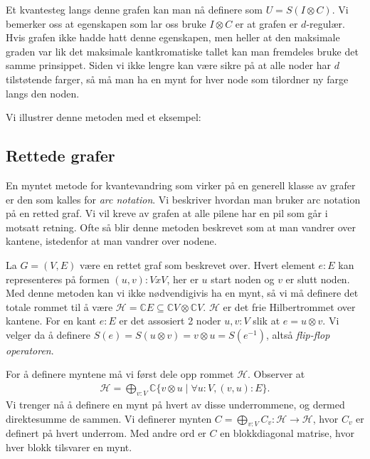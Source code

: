         Et kvantesteg langs denne grafen kan man nå definere som $U=S(I\otimes C)$. Vi bemerker oss at egenskapen som lar oss bruke $I\otimes C$ er at grafen er $d$-regulær. Hvis grafen ikke hadde hatt denne egenskapen, men heller at den maksimale graden var lik det maksimale kantkromatiske tallet kan man fremdeles bruke det samme prinsippet. Siden vi ikke lengre kan være sikre på at alle noder har $d$ tilstøtende farger, så må man ha en mynt for hver node som tilordner ny farge langs den noden.

        Vi illustrer denne metoden med et eksempel: 


    \subsection*{Rettede grafer}

        En myntet metode for kvantevandring som virker på en generell klasse av grafer er den som kalles for \emph{arc notation}. Vi beskriver hvordan man bruker arc notation på en retted graf. Vi vil kreve av grafen at alle pilene har en pil som går i motsatt retning. Ofte så blir denne metoden beskrevet som at man vandrer over kantene, istedenfor at man vandrer over nodene.

        La $G=(V,E)$ være en rettet graf som beskrevet over. Hvert element $e:E$ kan representeres på formen $(u,v):VxV$, her er $u$ start noden og $v$ er slutt noden. Med denne metoden kan vi ikke nødvendigivis ha en mynt, så vi må definere det totale rommet til å være $\mathcal{H}=\mathbb{C}E \subseteq \mathbb{C}V\otimes\mathbb{C}V$. $\mathcal{H}$ er det frie Hilbertrommet over kantene. For en kant $e:E$ er det assosiert 2 noder $u,v:V$ slik at $e=u\otimes v$. Vi velger da å definere $S(e)=S(u\otimes v)=v\otimes u = S(e^{-1})$, altså \emph{flip-flop operatoren}. 

        For å definere myntene må vi først dele opp rommet $\mathcal{H}$. Observer at 
        \begin{align*}
            \mathcal{H}=\bigoplus_{v:V}\mathbb{C}\{v\otimes u\mid \forall u:V,(v,u):E\}.
        \end{align*}
        Vi trenger nå å definere en mynt på hvert av disse underrommene, og dermed direktesumme de sammen. Vi definerer mynten $C = \bigoplus_{v:V}C_v:\mathcal{H}\rightarrow\mathcal{H}$, hvor $C_v$ er definert på hvert underrom. Med andre ord er $C$ en blokkdiagonal matrise, hvor hver blokk tilsvarer en mynt.

